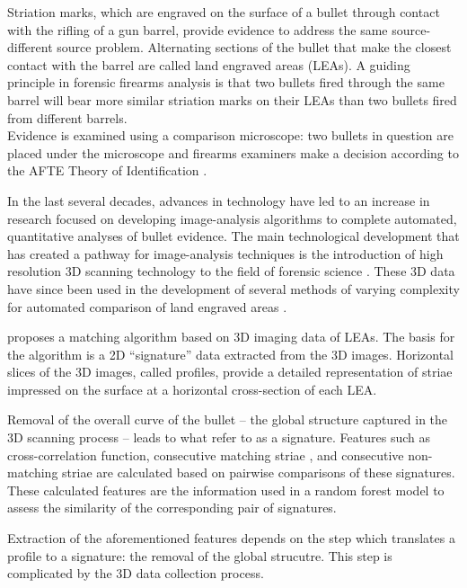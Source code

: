 \documentclass[]{article}
\begin{document}
Striation marks, which are engraved on the surface of a bullet through
contact with the rifling of a gun barrel, provide evidence to address
the same source-different source problem. Alternating sections of the
bullet that make the closest contact with the barrel are called land
engraved areas (LEAs). A guiding principle in forensic firearms analysis
is that two bullets fired through the same barrel will bear more similar
striation marks on their LEAs than two bullets fired from different
barrels.\\
Evidence is examined using a comparison microscope: two bullets in
question are placed under the microscope and firearms examiners make a
decision according to the AFTE Theory of Identification \citep{AFTE}.

In the last several decades, advances in technology have led to an
increase in research focused on developing image-analysis algorithms to
complete automated, quantitative analyses of bullet evidence. The main
technological development that has created a pathway for image-analysis
techniques is the introduction of high resolution 3D scanning technology
to the field of forensic science
\citep[e.g.][]{DeKinder1, DeKinder2, Bachrach1}. These 3D data have
since been used in the development of several methods of varying
complexity for automated comparison of land engraved areas
\citep[e.g.][]{Ma1, Chu1, Chu2, Hare1}.

\citet{Hare1} proposes a matching algorithm based on 3D imaging data of
LEAs. The basis for the algorithm is a 2D ``signature'' data extracted
from the 3D images. Horizontal slices of the 3D images, called profiles,
provide a detailed representation of striae impressed on the surface at
a horizontal cross-section of each LEA.

Removal of the overall curve of the bullet -- the global structure
captured in the 3D scanning process -- leads to what \citet{Hare1} refer
to as a signature. Features such as cross-correlation function,
consecutive matching striae \citep[see][]{Biasotti}, and consecutive
non-matching striae are calculated based on pairwise comparisons of
these signatures. These calculated features are the information used in
a random forest model to assess the similarity of the corresponding pair
of signatures.

Extraction of the aforementioned features depends on the step which
translates a profile to a signature: the removal of the global
strucutre. This step is complicated by the 3D data collection process.
\end{document}
